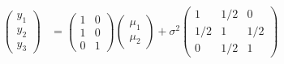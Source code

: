 \documentclass[11pt]{article}
\begin{document}
\begin{align*}
\begin{pmatrix} y_1 \\ y_2 \\ y_3 \end{pmatrix} &= 
\begin{pmatrix} 1 & 0 \\ 1 & 0 \\ 0 & 1 \end{pmatrix} 
\begin{pmatrix} \mu_1 \\ \mu_2 \end{pmatrix} + \sigma^2 
\begin{pmatrix} 1 & 1/2 & 0 \\ 1/2 & 1 & 1/2 \\ 0 & 1/2 & 1 \end{pmatrix}
\end{align*}
\end{document}
